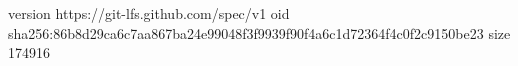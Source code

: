 version https://git-lfs.github.com/spec/v1
oid sha256:86b8d29ca6c7aa867ba24e99048f3f9939f90f4a6c1d72364f4c0f2c9150be23
size 174916
